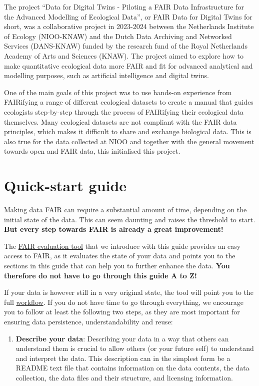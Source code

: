 \documentclass[
  oneside]{book}
\providecommand{\tightlist}{%
  \setlength{\itemsep}{0pt}\setlength{\parskip}{0pt}}
\begin{document}
The project ``Data for Digital Twins - Piloting a FAIR Data Infrastructure for the Advanced Modelling of Ecological Data'', or FAIR Data for Digital Twins for short, was a collaborative project in 2023-2024 between the Netherlands Institute of Ecology (NIOO-KNAW) and the Dutch Data Archiving and Networked Services (DANS-KNAW) funded by the research fund of the Royal Netherlands Academy of Arts and Sciences (KNAW). The project aimed to explore how to make quantitative ecological data more FAIR and fit for advanced analytical and modelling purposes, such as artificial intelligence and digital twins.

One of the main goals of this project was to use hands-on experience from FAIRifying a range of different ecological datasets to create a manual that guides ecologists step-by-step through the process of FAIRifying their ecological data themselves. Many ecological datasets are not compliant with the FAIR data principles, which makes it difficult to share and exchange biological data. This is also true for the data collected at NIOO and together with the general movement towards open and FAIR data, this initialised this project.

\chapter*{Quick-start guide}\label{quick-start}

Making data FAIR can require a substantial amount of time, depending on the initial state of the data. This can seem daunting and raises the threshold to start. \textbf{But every step towards FAIR is already a great improvement!}

The \hyperref[evaluation]{FAIR evaluation tool} that we introduce with this guide provides an easy access to FAIR, as it evaluates the state of your data and points you to the sections in this guide that can help you to further enhance the data. \textbf{You therefore do not have to go through this guide A to Z!}

If your data is however still in a very original state, the tool will point you to the full \hyperref[workflow]{workflow}. If you do not have time to go through everything, we encourage you to follow at least the following two steps, as they are most important for ensuring data persistence, understandability and reuse:

\begin{enumerate}
\def\labelenumi{\arabic{enumi}.}
\tightlist
\item
  \textbf{Describe your data}: Describing your data in a way that others can understand them is crucial to allow others (or your future self) to understand and interpret the data. This description can in the simplest form be a README text file that contains information on the data contents, the data collection, the data files and their structure, and licensing information.
\end{enumerate}
\end{document}
